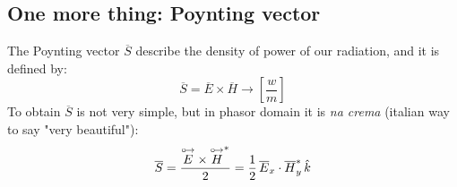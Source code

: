 \subsection*{One more thing: Poynting vector}
The Poynting vector $\overline{S}$ describe the density of power of our radiation, and it is defined by:
\begin{equation}\label{eq:poynting}
    \overline{S}=\overline{E}\times\overline{H}\rightarrow\left[\frac{w}{m}\right]
\end{equation}
To obtain $\overline{S}$ is not very simple, but in phasor domain it is \emph{na crema} (italian way to say "very beautiful"):
\begin{equation}
    \overline{S}=\frac{\overset{\mathbin {{\circ \mkern-2.5mu\rightarrow}}}{E}\times\overset{\mathbin {{\circ \mkern-2.5mu\rightarrow}}}{H}^*}{2}=\frac{1}{2}\,\overline{E}
_x\cdot\overline{H}_y^*\,\hat{\mathnormal{k}}
\end{equation}